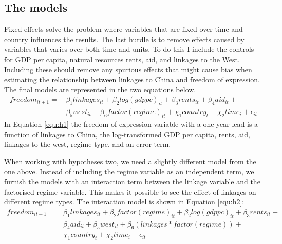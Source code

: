 \subsection{The models}
Fixed effects solve the problem where variables that are fixed over time and country influences the results. The last hurdle is to remove effects caused by variables that varies over both time and units. To do this I include the controls for GDP per capita, natural resources rents, aid, and linkages to the West. Including these should remove any spurious effects that might cause bias when estimating the relationship between linkages to China and freedom of expression. The final models are represented in the two equations below.
\begin{align} \label{equ:h1}
    freedom_{it+1} =\, & \beta_1  linkages_{it} + \beta_2 log(gdppc)_{it} + \beta_3 rents_{it} + \beta_4aid_{it} + \nonumber\\
    & \beta_5 west_{it} + \beta_6  factor(regime)_{it} + \chi_1 country_t + \chi_2 time_i + \epsilon_{it}
\end{align}
In Equation \ref{equ:h1} the freedom of expression variable with a one-year lead is a function of  linkages to China, the log-transformed GDP per capita, rents, aid, linkages to the west, regime type, and an error term.

When working with hypotheses two, we need a slightly different model from the one above. Instead of including the regime variable as an independent term, we furnish the models with an interaction term between the linkage variable and the factorised regime variable. This makes it possible to see the effect of linkages on different regime types. The interaction model is shown in Equation \ref{equ:h2}:
\begin{align} \label{equ:h2}
    freedom_{it+1} =\, & \beta_1 linkages_{it} + \beta_2 factor(regime)_{it} + \beta_2 log(gdppc)_{it} + \beta_3 rents_{it} + \nonumber\\
    & \beta_4 aid_{it} + \beta_5 west_{it} + \beta_6 (linkages * factor(regime)) + \nonumber\\
    & \chi_1 country_t +\chi_2 time_i + \epsilon_{it}
\end{align}
